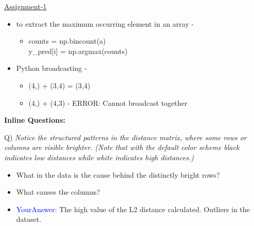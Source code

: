 \documentclass[twoside]{article}
\begin{document}
\underline{Assignment-1}\\
\begin{itemize}
\item to extract the maximum occurring element in an array - 
\begin{itemize}
\item counts =  np.bincount(a) \\
y\_pred[i] = np.argmax(counts)


\end{itemize}
\item Python broadcasting - 
\begin{itemize}
    \item (4,) + (3,4) = (3,4)
    \item (4,) + (4,3) - ERROR: Cannot broadcast together
\end{itemize}

\end{itemize}

\textbf{Inline Questions:}

Q) \textit{Notice the structured patterns in the distance matrix, where some rows or columns are visible brighter. (Note that with the default color scheme black indicates low distances while white indicates high distances.)}

\begin{itemize}
    \item What in the data is the cause behind the distinctly bright rows?
    \item What causes the columns?
    \item \textcolor{blue}{YourAnswer}:  The high value of the L2 distance calculated. Outliers in the dataset.
\end{itemize}
\end{document}
